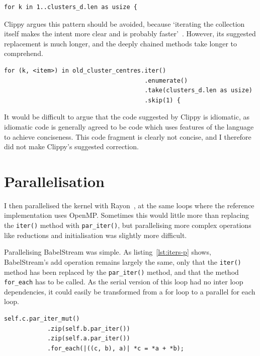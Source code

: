 \begin{code}
\begin{verbatim}
for k in 1..clusters_d.len as usize {
\end{verbatim}
\label{lst:for-concise}
\end{code}
Clippy argues this pattern should be avoided, because `iterating the collection itself makes the intent more clear and is probably faster'~\cite{ClippyLoop}. However, its suggested replacement is much longer, and the deeply chained methods take longer to comprehend.
\begin{code}
\begin{verbatim}
for (k, <item>) in old_cluster_centres.iter()
                                       .enumerate()
                                       .take(clusters_d.len as usize)
                                       .skip(1) {
\end{verbatim}
\end{code}
It would be difficult to argue that the code suggested by Clippy is idiomatic, as idiomatic code is generally agreed to be code which uses features of the language to achieve conciseness. This code fragment is clearly not concise, and I therefore did not make Clippy's suggested correction.
\section{Parallelisation}
I then parallelised the kernel with Rayon~\cite{RustRayon}, at the same loops where the reference implementation uses OpenMP\@. Sometimes this would little more than replacing the \texttt{iter()} method with \texttt{par\_iter()}, but parallelising more complex operations like reductions and initialisation was slightly more difficult.

Parallelising BabelStream was simple. As listing~\ref{lst:iters-p} shows, BabelStream's add operation remains largely the same, only that the \texttt{iter()} method has been replaced by the \texttt{par\_iter()} method, and that the method \texttt{for\_each} has to be called. As the serial version of this loop had no inter loop dependencies, it could easily be transformed from a for loop to a parallel for each loop.
\begin{code}
\begin{verbatim}
self.c.par_iter_mut()
            .zip(self.b.par_iter())
            .zip(self.a.par_iter())
            .for_each(|((c, b), a)| *c = *a + *b);
\end{verbatim}
\label{lst:iters-p}
\end{code}


